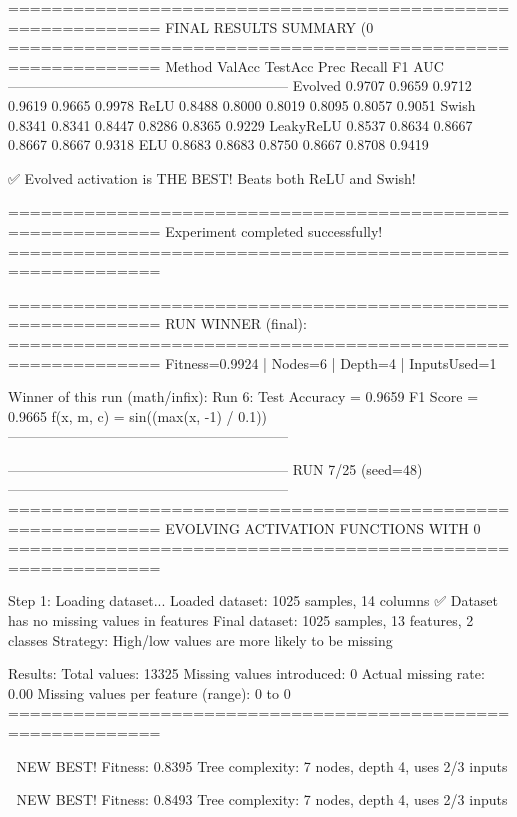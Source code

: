 ============================================================
FINAL RESULTS SUMMARY (0%
============================================================
Method             ValAcc     TestAcc    Prec       Recall     F1         AUC
------------------------------------------------------------
Evolved            0.9707     0.9659     0.9712     0.9619     0.9665     0.9978
ReLU               0.8488     0.8000     0.8019     0.8095     0.8057     0.9051
Swish              0.8341     0.8341     0.8447     0.8286     0.8365     0.9229
LeakyReLU          0.8537     0.8634     0.8667     0.8667     0.8667     0.9318
ELU                0.8683     0.8683     0.8750     0.8667     0.8708     0.9419

✅ Evolved activation is THE BEST! Beats both ReLU and Swish!

============================================================
Experiment completed successfully!
============================================================

============================================================
RUN WINNER (final):
============================================================
Fitness=0.9924 | Nodes=6 | Depth=4 | InputsUsed=1

Winner of this run (math/infix):
  Run 6:
     Test Accuracy = 0.9659
     F1 Score      = 0.9665
     f(x, m, c)    = sin((max(x, -1) / 0.1))
------------------------------------------------------------

------------------------------------------------------------
RUN 7/25 (seed=48)
------------------------------------------------------------
============================================================
EVOLVING ACTIVATION FUNCTIONS
WITH 0%
============================================================

Step 1: Loading dataset...
Loaded dataset: 1025 samples, 14 columns
✅ Dataset has no missing values in features
Final dataset: 1025 samples, 13 features, 2 classes
Strategy: High/low values are more likely to be missing

Results:
  Total values: 13325
  Missing values introduced: 0
  Actual missing rate: 0.00%
  Missing values per feature (range): 0 to 0
============================================================


🎯 NEW BEST! Fitness: 0.8395
Tree complexity: 7 nodes, depth 4, uses 2/3 inputs

🎯 NEW BEST! Fitness: 0.8493
Tree complexity: 7 nodes, depth 4, uses 2/3 inputs

